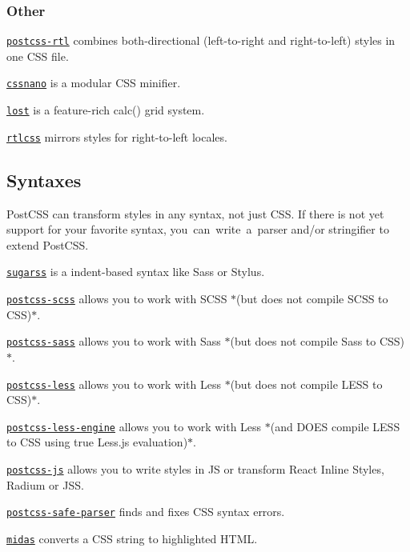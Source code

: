 \subsubsection*{Other}


\begin{DoxyItemize}
\item \href{https://github.com/vkalinichev/postcss-rtl}{\tt {\ttfamily postcss-\/rtl}} combines both-\/directional (left-\/to-\/right and right-\/to-\/left) styles in one C\+SS file.
\item \href{http://cssnano.co}{\tt {\ttfamily cssnano}} is a modular C\+SS minifier.
\item \href{https://github.com/peterramsing/lost}{\tt {\ttfamily lost}} is a feature-\/rich {\ttfamily calc()} grid system.
\item \href{https://github.com/MohammadYounes/rtlcss}{\tt {\ttfamily rtlcss}} mirrors styles for right-\/to-\/left locales.
\end{DoxyItemize}

\subsection*{Syntaxes}

Post\+C\+SS can transform styles in any syntax, not just C\+SS. If there is not yet support for your favorite syntax, you can write a parser and/or stringifier to extend Post\+C\+SS.


\begin{DoxyItemize}
\item \href{https://github.com/postcss/sugarss}{\tt {\ttfamily sugarss}} is a indent-\/based syntax like Sass or Stylus.
\item \href{https://github.com/postcss/postcss-scss}{\tt {\ttfamily postcss-\/scss}} allows you to work with S\+C\+SS $\ast$(but does not compile S\+C\+SS to C\+SS)$\ast$.
\item \href{https://github.com/AleshaOleg/postcss-sass}{\tt {\ttfamily postcss-\/sass}} allows you to work with Sass $\ast$(but does not compile Sass to C\+SS)$\ast$.
\item \href{https://github.com/webschik/postcss-less}{\tt {\ttfamily postcss-\/less}} allows you to work with Less $\ast$(but does not compile L\+E\+SS to C\+SS)$\ast$.
\item \href{https://github.com/Crunch/postcss-less}{\tt {\ttfamily postcss-\/less-\/engine}} allows you to work with Less $\ast$(and D\+O\+ES compile L\+E\+SS to C\+SS using true Less.\+js evaluation)$\ast$.
\item \href{https://github.com/postcss/postcss-js}{\tt {\ttfamily postcss-\/js}} allows you to write styles in JS or transform React Inline Styles, Radium or J\+SS.
\item \href{https://github.com/postcss/postcss-safe-parser}{\tt {\ttfamily postcss-\/safe-\/parser}} finds and fixes C\+SS syntax errors.
\item \href{https://github.com/ben-eb/midas}{\tt {\ttfamily midas}} converts a C\+SS string to highlighted H\+T\+ML.
\end{DoxyItemize}

